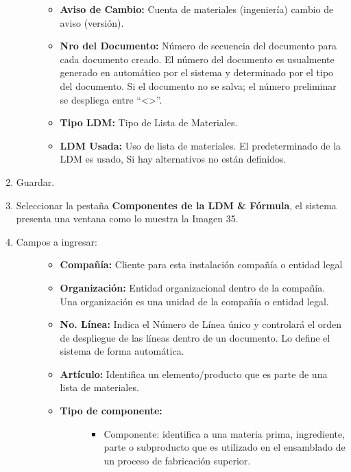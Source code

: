 \documentclass[letterpaper,10pt,spanish]{sphinxmanual}
\begin{document}
\begin{enumerate}
\begin{description}
\begin{itemize}
\item {} 
\textbf{Aviso de Cambio:} Cuenta de materiales (ingeniería) cambio de aviso (versión).

\item {} 
\textbf{Nro del Documento:} Número de secuencia del documento para cada documento creado. El número del documento es usualmente generado en automático por el sistema y determinado por el tipo del documento. Si el documento no se salva; el número preliminar se despliega entre ``\textless{}\textgreater{}''.

\item {} 
\textbf{Tipo LDM:} Tipo de Lista de Materiales.

\item {} 
\textbf{LDM Usada:} Uso de lista de materiales. El predeterminado de la LDM es usado, Si hay alternativos no están definidos.

\end{itemize}

\end{description}

\item {} 
Guardar.

\item {} 
Seleccionar la pestaña \textbf{Componentes de la LDM \& Fórmula}, el sistema presenta una ventana como lo muestra la Imagen 35.

\item {} \begin{description}
\item[{Campos a ingresar:}] \leavevmode\begin{itemize}
\item {} 
\textbf{Compañía:} Cliente para esta instalación compañía o entidad legal

\item {} 
\textbf{Organización:} Entidad organizacional dentro de la compañía. Una organización es una unidad de la compañía o entidad legal.

\item {} 
\textbf{No. Línea:} Indica el Número de Línea único y controlará el orden de despliegue de las líneas dentro de un documento. Lo define el sistema de forma automática.

\item {} 
\textbf{Artículo:} Identifica un elemento/producto que es parte de una lista de materiales.

\item {} \begin{description}
\item[{\textbf{Tipo de componente:}}] \leavevmode\begin{itemize}
\item {} 
Componente: identifica a una materia prima, ingrediente, parte o subproducto que es utilizado en el ensamblado de un proceso de fabricación superior.


\end{itemize}
\end{description}
\end{itemize}
\end{description}
\end{enumerate}
\end{document}
